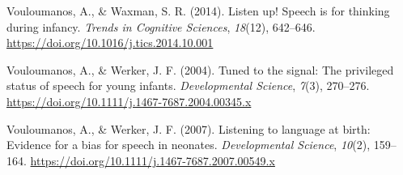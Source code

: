\documentclass[
  english,
  man]{apa6}
\newlength{\cslhangindent}
\newlength{\cslentryspacingunit} %
\newenvironment{CSLReferences}[2] %
 {%
  \setlength{\parindent}{0pt}
  \ifodd #1
  \let\oldpar\par
  \def\par{\hangindent=\cslhangindent\oldpar}
  \fi
  \setlength{\parskip}{#2\cslentryspacingunit}
 }%
 {}
\begin{document}
\begin{CSLReferences}{1}{0}
\leavevmode{}%
Vouloumanos, A., \& Waxman, S. R. (2014). Listen up! {Speech} is for thinking during infancy. \emph{Trends in Cognitive Sciences}, \emph{18}(12), 642--646. \url{https://doi.org/10.1016/j.tics.2014.10.001}

\leavevmode{}%
Vouloumanos, A., \& Werker, J. F. (2004). Tuned to the signal: The privileged status of speech for young infants. \emph{Developmental Science}, \emph{7}(3), 270--276. \url{https://doi.org/10.1111/j.1467-7687.2004.00345.x}

\leavevmode{}%
Vouloumanos, A., \& Werker, J. F. (2007). Listening to language at birth: Evidence for a bias for speech in neonates. \emph{Developmental Science}, \emph{10}(2), 159--164. \url{https://doi.org/10.1111/j.1467-7687.2007.00549.x}

\end{CSLReferences}

\endgroup
\end{document}
